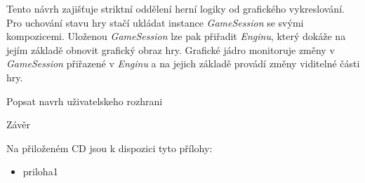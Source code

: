 \documentclass[twoside,12pt]{article}
\begin{document}
Tento návrh zajišťuje striktní oddělení herní logiky od grafického vykreslování. Pro uchování stavu hry stačí ukládat instance \textit{GameSession} se svými kompozicemi. Uloženou \textit{GameSession} lze pak přiřadit \textit{Enginu}, který dokáže na jejím základě obnovit grafický obraz hry. Grafické jádro monitoruje změny v \textit{GameSession} přiřazené v \textit{Enginu} a na jejich základě provádí změny viditelné části hry. 


Popsat navrh uživatelskeho rozhrani
% 
\newpage

%
%
Závěr

%

%
%
Na přiloženém CD jsou k dispozici tyto přílohy: 
\begin{itemize}
\item priloha1
\end{itemize}
\end{document}
